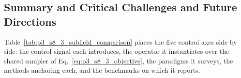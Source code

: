 










\subsection{Summary and Critical Challenges and Future Directions}
\label{subsec:p3_s8_3_6}
\label{subsec:p3_s8_3_summary}

Table~\ref{tab:p3_s8_3_subfield_comparison} places the five control axes side by side: the control signal each introduces, the operator it instantiates over the shared sampler of Eq.~\eqref{eq:p3_s8_3_objective}, the paradigms it surveys, the methods anchoring each, and the benchmarks on which it reports.

